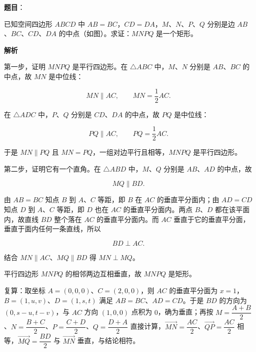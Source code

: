 \begin{answer}

\textbf{题目}：

已知空间四边形 $ABCD$ 中 $AB=BC$，$CD=DA$，$M$、$N$、$P$、$Q$ 分别是边 $AB$、$BC$、$CD$、$DA$ 的中点（如图）。求证：$MNPQ$ 是一个矩形。
\nopagebreak[4]
\begin{center}\end{center}
\nopagebreak[4]
\textbf{解析}
\nopagebreak[4]
\begin{center}\end{center}
\nopagebreak[4]
第一步，证明 $MNPQ$ 是平行四边形。在 $\triangle ABC$ 中，$M$、$N$ 分别是 $AB$、$BC$ 的中点，故 $MN$ 是中位线：

\nopagebreak[4]
\[
MN\parallel AC,\qquad MN=\frac12AC.
\]

在 $\triangle ADC$ 中，$P$、$Q$ 分别是 $CD$、$DA$ 的中点，故 $PQ$ 是中位线：

\nopagebreak[4]
\[
PQ\parallel AC,\qquad PQ=\frac12AC.
\]

于是 $MN\parallel PQ$ 且 $MN=PQ$，一组对边平行且相等，$MNPQ$ 是平行四边形。

第二步，证明它有一个直角。在 $\triangle ABD$ 中，$M$、$Q$ 分别是 $AB$、$AD$ 的中点，故

\nopagebreak[4]
\[
MQ\parallel BD.
\]

由 $AB=BC$ 知点 $B$ 到 $A$、$C$ 等距，即 $B$ 在 $AC$ 的垂直平分面内；由 $AD=CD$ 知点 $D$ 到 $A$、$C$ 等距，即 $D$ 也在 $AC$ 的垂直平分面内。两点 $B$、$D$ 都在该平面内，故直线 $BD$ 整个落在 $AC$ 的垂直平分面内。而 $AC$ 垂直于它的垂直平分面，垂直于面内任何一条直线，所以

\nopagebreak[4]
\[
BD\perp AC.
\]

结合 $MN\parallel AC$、$MQ\parallel BD$ 得 $MN\perp MQ$。

平行四边形 $MNPQ$ 的相邻两边互相垂直，故 $MNPQ$ 是矩形。

复算：取坐标 $A=(0,0,0)$、$C=(2,0,0)$，则 $AC$ 的垂直平分面为 $x=1$，$B=(1,u,v)$、$D=(1,s,t)$ 满足 $AB=BC$、$AD=CD$。于是 $BD$ 的方向为 $(0,s-u,t-v)$，与 $AC$ 方向 $(1,0,0)$ 点积为 $0$，确为垂直；再按 $M=\dfrac{A+B}2$、$N=\dfrac{B+C}2$、$P=\dfrac{C+D}2$、$Q=\dfrac{D+A}2$ 直接计算，$\overrightarrow{MN}=\dfrac{AC}2$、$\overrightarrow{QP}=\dfrac{AC}2$ 相等，$\overrightarrow{MQ}=\dfrac{BD}2$ 与 $\overrightarrow{MN}$ 垂直，与结论相符。


\end{answer}
